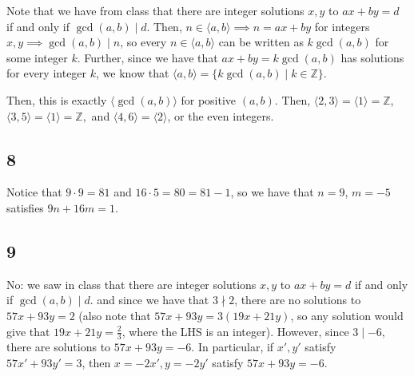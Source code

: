 \documentclass[12pt,letterpaper]{article}
\theoremstyle{definition}
\newcommand{\Z}{\mathbb{Z}}
\begin{document}
Note that we have from class that there are integer solutions $x,y$ to $ax + by = d$ if and only if $\gcd(a,b) \mid d$. Then, $n \in \langle a, b\rangle \implies n = ax + by$ for integers $x, y \implies \gcd(a,b) \mid n$, so every $n \in \langle a, b \rangle$ can be written as $k\gcd(a,b)$ for some integer $k$. Further, since we have that $ax + by = k\gcd(a,b)$ has solutions for every integer $k$, we know that $\langle a, b \rangle = \{k\gcd(a,b) \mid k \in \Z\}$.

Then, this is exactly $\langle \gcd(a,b) \rangle$ for positive $(a,b)$. Then, $\langle 2,3\rangle = \langle 1 \rangle = \Z$, $\langle 3,5\rangle = \langle 1 \rangle = \Z,$ and $\langle 4,6 \rangle = \langle 2 \rangle$, or the even integers.

\subsection*{8}

Notice that $9 \cdot 9 = 81$ and $16 \cdot 5 = 80 = 81 - 1$, so we have that $n = 9$, $m = -5$ satisfies $9n + 16m = 1$.

\subsection*{9}

No: we saw in class that there are integer solutions $x,y$ to $ax + by = d$ if and only if $\gcd(a,b) \mid d$. and since we have that $3 \nmid 2$, there are no solutions to $57x + 93y = 2$ (also note that $57x + 93y = 3(19x + 21y)$, so any solution would give that $19x + 21y = \frac{2}{3}$, where the LHS is an integer). However, since $3 \mid -6$, there are solutions to $57x + 93y = -6$. In particular, if $x',y'$ satisfy $57x' + 93y' = 3$, then $x = -2x', y = -2y'$ satisfy $57x + 93y = -6$.
\end{document}

